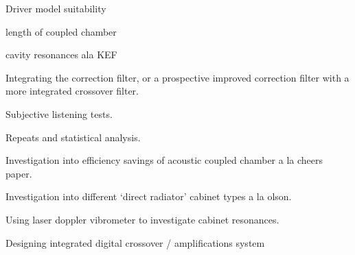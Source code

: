 \documentclass{report}
\begin{document}
    Driver model suitability

    length of coupled chamber

    cavity resonances ala KEF

    Integrating the correction filter, or a prospective improved correction filter with a more integrated crossover filter.

    Subjective listening tests.

    Repeats and statistical analysis.

    Investigation into efficiency savings of acoustic coupled chamber a la cheers paper.

    Investigation into different `direct radiator' cabinet types a la olson.
    
    Using laser doppler vibrometer to investigate cabinet resonances.

    Designing integrated digital crossover / amplifications system



\end{document}
